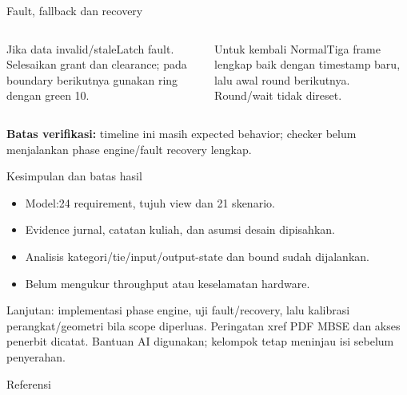 \documentclass[aspectratio=169,11pt]{beamer}
\begin{document}
\begin{frame}{Fault, fallback dan recovery}
\begin{columns}[T]
\begin{block}{Jika data invalid/stale}Latch fault. Selesaikan grant dan clearance; pada boundary berikutnya gunakan ring dengan green 10.\end{block}
\begin{block}{Untuk kembali Normal}Tiga frame lengkap baik dengan timestamp baru, lalu awal round berikutnya. Round/wait tidak direset.\end{block}
\end{columns}
\vspace{4mm}\textbf{Batas verifikasi:} timeline ini masih expected behavior; checker belum menjalankan phase engine/fault recovery lengkap.
\end{frame}

\begin{frame}{Kesimpulan dan batas hasil}
\begin{itemize}
\item Model:24 requirement, tujuh view dan 21 skenario.
\item Evidence jurnal, catatan kuliah, dan asumsi desain dipisahkan.
\item Analisis kategori/tie/input/output-state dan bound sudah dijalankan.
\item Belum mengukur throughput atau keselamatan hardware.
\end{itemize}
\vspace{3mm}\small Lanjutan: implementasi phase engine, uji fault/recovery, lalu kalibrasi perangkat/geometri bila scope diperluas. Peringatan xref PDF MBSE dan akses penerbit dicatat. Bantuan AI digunakan; kelompok tetap meninjau isi sebelum penyerahan.
\end{frame}

\begin{frame}{Referensi}
\tiny
\end{frame}
\end{document}
